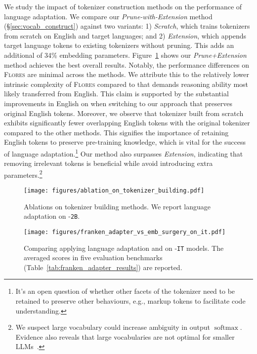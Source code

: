 We study the impact of tokenizer construction methods on the performance of language adaptation. We compare our \emph{Prune-with-Extension} method (\S\ref{sec:vocab_construct}) against two variants: 1) \emph{Scratch}, which trains tokenizers from scratch on English and target languages; and 2) \emph{Extension}, which appends target language tokens to existing tokenizers without pruning. This adds an additional of 34\% embedding parameters. Figure~\ref{fig:ablation_on_tokenizer_building} shows our \emph{Prune+Extension} method achieves the best overall results. Notably, the performance differences on \textsc{Flores} are minimal across the methods. We attribute this to the relatively lower intrinsic complexity of \textsc{Flores} compared to \belebele that demands reasoning ability most likely transferred from English. This claim is supported by the substantial improvements in English on \belebele when switching to our approach that preserves original English tokens. Moreover, we observe that tokenizer built from scratch exhibits significantly fewer overlapping English tokens with the original tokenizer compared to the other methods. This signifies the importance of retaining English tokens to preserve pre-training knowledge, which is vital for the success of language adaptation.\footnote{It's an open question of whether other facets of the tokenizer need to be retained to preserve other behaviours, e.g., markup tokens to facilitate code understanding.} Our method also surpasses \emph{Extension}, indicating that removing irrelevant tokens is beneficial while avoid introducing extra parameters.\footnote{We suspect large vocabulary could increase ambiguity in output $\operatorname{softmax}$. Evidence also reveals that large vocabularies are not optimal for smaller LLMs~\citep{tao2024scaling}.}

\begin{figure}[t]
    \setlength{\abovecaptionskip}{-0.0001cm}
    \setlength{\belowcaptionskip}{-0.35cm}
    \centering
    \texttt{[image: figures/ablation\_on\_tokenizer\_building.pdf]}
    \vspace{-9mm}
    \caption{Ablations on tokenizer building methods. We report \sea language adaptation on \gemmatwo-\texttt{2B}.}
    \vspace{-4.5mm}
    \label{fig:ablation_on_tokenizer_building}
\end{figure}
\begin{figure}[t]
    \setlength{\abovecaptionskip}{-0.0001cm}
    \setlength{\belowcaptionskip}{-0.35cm}
    \centering
    \texttt{[image: figures/franken\_adapter\_vs\_emb\_surgery\_on\_it.pdf]}
    \vspace{-9mm}
    \caption{Comparing applying language adaptation and \ouradapter on \gemmatwo-\texttt{IT} models. The averaged scores in five evaluation benchmarks (Table~\ref{tab:franken_adapter_results}) are reported.}
    \vspace{-6mm}
    \label{fig:franken_adapter_vs_emb_surgery_on_it}
\end{figure}

